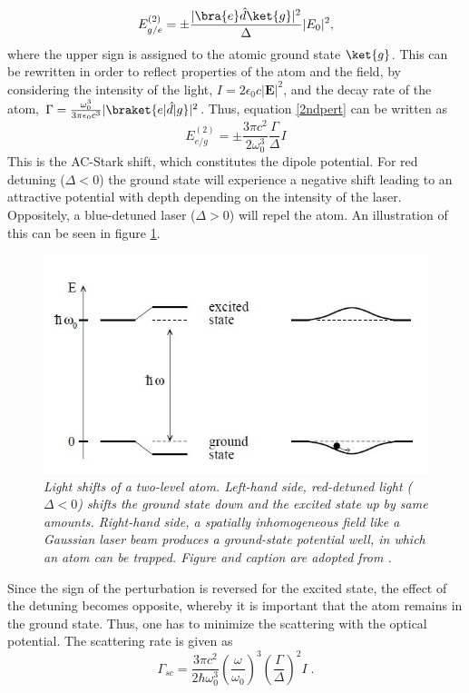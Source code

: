 \begin{equation}
	E_{g/e}^{(2)}=\pm  \frac{ |\bra{e}\hat{d}\ket{g}|^2}{\Delta} |E_0|^2,
	\label{2ndpert}
\end{equation}
where the upper sign is assigned to the atomic ground state $\ket{g}$. This can be rewritten in order to reflect properties of the atom and the field, by considering the intensity of the light, $I = 2 \epsilon_0 c |\boldsymbol{E}|^2 $, and the decay rate of the atom, $\Gamma = \frac{\omega_{0}^3}{3 \pi \epsilon_0 c^3} |\braket{e | \hat{d} | g}|^2$. Thus, equation \eqref{2ndpert} can be written as \cite{grimm} 
\begin{equation}
	E_{e/g}^{(2)}=\pm \frac{3 \pi c^2}{2 \omega_{0}^3} \frac{\Gamma}{\Delta}I
	\label{eq:dipolepot}
\end{equation}
This is the AC-Stark shift, which constitutes the dipole potential. For red detuning ($\Delta < 0$) the ground state will experience a negative shift leading to an attractive potential with depth depending on the intensity of the laser. Oppositely, a blue-detuned laser ($\Delta > 0$) will repel the atom. An illustration of this can be seen in figure \ref{fig:ac_stark}.
\begin{figure}[!h]
	\centering
	\includegraphics[width=0.5\columnwidth]{Figures/acstark.JPG} 
	\caption{\textit{Light shifts of a two-level atom. Left-hand side,
		red-detuned light ($\Delta < 0$) shifts the ground state down and the
		excited state up by same amounts. Right-hand side, a spatially
		inhomogeneous field like a Gaussian laser beam produces a
		ground-state potential well, in which an atom can be trapped. Figure and 		caption are adopted from \cite{grimm}.}}
	\label{fig:ac_stark} 
\end{figure}
Since the sign of the perturbation is reversed for the excited state, the effect of the detuning becomes opposite, whereby it is important that the atom remains in the ground state. Thus, one has to minimize the scattering with the optical potential. The scattering rate is given as \cite{grimm}
\begin{equation}
	\Gamma_{sc} = \frac{3 \pi c^2}{2 \hbar \omega_{0}^3} \left( \frac{\omega}{\omega_0} \right) ^3 \left( \frac{\Gamma}{\Delta} \right) ^2 I \; .
\end{equation}
